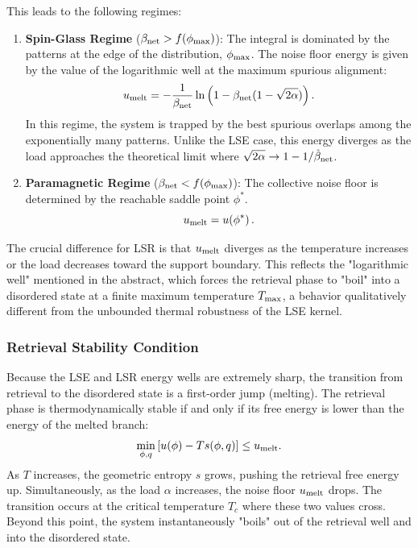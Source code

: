 \documentclass{article}
\theoremstyle{plain}
\theoremstyle{definition}
\theoremstyle{remark}
\begin{document}
This leads to the following regimes:
\begin{enumerate}
    \item \textbf{Spin-Glass Regime} ($\beta_{\rm net} > f(\phi_{\rm max})$): 
    The integral is dominated by the patterns at the edge of the distribution, $\phi_{\rm max}$. The noise floor energy is given by the value of the logarithmic well at the maximum spurious alignment:
    \begin{equation}
        u_{\rm melt} = -\frac{1}{\beta_{\rm net}} \ln \left( 1 - \beta_{\rm net} (1 - \sqrt{2\alpha}) \right).
    \end{equation}
    In this regime, the system is trapped by the best spurious overlaps among the exponentially many patterns. Unlike the LSE case, this energy diverges as the load approaches the theoretical limit where $\sqrt{2\alpha} \to 1 - 1/\hat\beta_{\rm net}$.
    
    \item \textbf{Paramagnetic Regime} ($\beta_{\rm net} < f(\phi_{\rm max})$): 
    The collective noise floor is determined by the reachable saddle point $\phi^*$. 
    \begin{equation}
        u_{\rm melt} = u(\phi^*)\,.
    \end{equation}
    
\end{enumerate}


The crucial difference for LSR is that $u_{\rm melt}$ diverges as the temperature increases or the load decreases toward the support boundary. This reflects the "logarithmic well" mentioned in the abstract, which forces the retrieval phase to "boil" into a disordered state at a finite maximum temperature $T_{\rm max}$, a behavior qualitatively different from the unbounded thermal robustness of the LSE kernel.

\subsubsection{Retrieval Stability Condition}

Because the LSE and LSR energy wells are extremely sharp, the transition from retrieval to the disordered state is a first-order jump (melting). The retrieval phase is thermodynamically stable if and only if its free energy is lower than the energy of the melted branch:
\begin{equation}
    \min_{\phi, q} \left[ u(\phi) - T s(\phi, q) \right] \leq u_{\rm melt}.
\end{equation}
As $T$ increases, the geometric entropy $s$ grows, pushing the retrieval free energy up. Simultaneously, as the load $\alpha$ increases, the noise floor $u_{\rm melt}$ drops. The transition occurs at the critical temperature $T_c$ where these two values cross. Beyond this point, the system instantaneously "boils" out of the retrieval well and into the disordered state.
\end{document}
